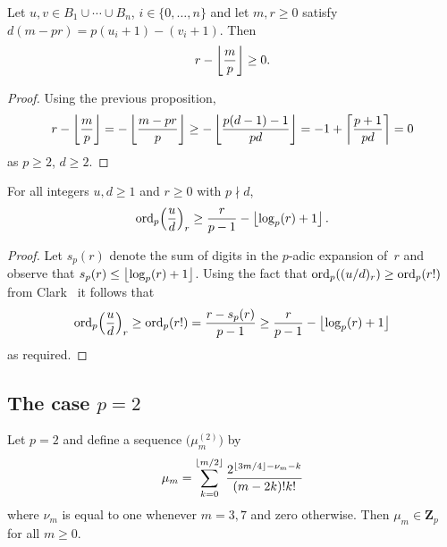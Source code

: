 \begin{prop} \label{prop:mpr2}
Let $u, v \in B_1 \cup \dotsb \cup B_n$, $i \in \{0,\dotsc,n\}$ and 
let $m, r \geq 0$ satisfy $d(m-pr) = p(u_i + 1) - (v_i + 1)$.  Then 
\begin{equation*}
r - \left\lfloor\frac{m}{p}\right\rfloor \geq 0.
\end{equation*}
\end{prop}

\begin{proof}
Using the previous proposition,
\begin{equation*}
r - \left\lfloor\frac{m}{p}\right\rfloor 
= - \left\lfloor\frac{m-pr}{p}\right\rfloor 
\geq - \left\lfloor\frac{p(d-1)-1}{pd}\right\rfloor 
= -1 + \left\lceil\frac{p + 1}{pd}\right\rceil 
= 0 
\end{equation*}
as $p \geq 2$, $d \geq 2$.
\end{proof}

\begin{prop} \label{prop:rfac}
For all integers $u, d \geq 1$ and $r \geq 0$ with $p \nmid d$, 
\begin{equation*}
\operatorname{ord}_p\Bigl(\frac{u}{d}\Bigr)_r \geq \frac{r}{p-1} - \left\lfloor\log_p(r) + 1\right\rfloor.
\end{equation*}
\end{prop}

\begin{proof}
Let $s_p(r)$ denote the sum of digits in the $p$-adic expansion of~$r$ 
and observe that $s_p(r) \leq \left\lfloor\log_p(r) + 1\right\rfloor$.  Using the fact that 
$\operatorname{ord}_p((u/d)_r) \geq \operatorname{ord}_p(r!)$ from Clark~\citep[Page~265, Case~3]{Clark66} 
it follows that 
\begin{equation*}
\operatorname{ord}_p\Bigl(\frac{u}{d}\Bigr)_r \geq \operatorname{ord}_p(r!) = \frac{r - s_p(r)}{p-1} \geq \frac{r}{p-1} - \left\lfloor\log_p(r) + 1\right\rfloor
\end{equation*}
as required.
\end{proof}


\subsection{The case $p = 2$}

\begin{lem} \label{lem:mu2}
Let $p = 2$ and define a sequence $\bigl(\mu_m^{(2)}\bigr)$ by 
\begin{equation*}
\mu_m = 
    \sum_{k=0}^{\left\lfloor m/2\right\rfloor} \frac{2^{\left\lfloor3m/4\right\rfloor - \nu_m - k}}{(m-2k)! k!}
\end{equation*}
where $\nu_m$ is equal to one whenever $m = 3, 7$ and zero otherwise. 
Then $\mu_m \in \mathbf{Z}_p$ for all $m \geq 0$.
\end{lem}

